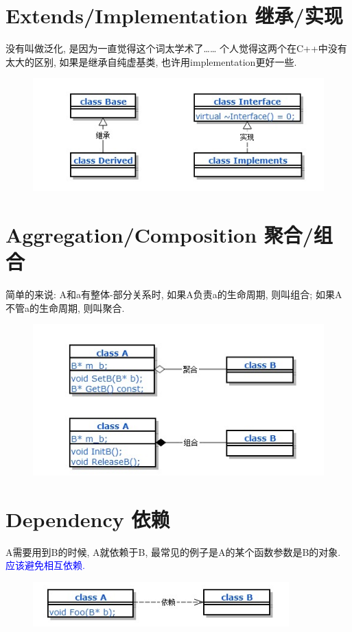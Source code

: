 \section {\ZHH Extends/Implementation 继承/实现} {
    { 没有叫做泛化, 是因为一直觉得这个词太学术了…… 个人觉得这两个在C++中没有太大的区别, 如果是继承自纯虚基类, 也许用implementation更好一些. } \\
    \begin {figure} [htbp]
        \centering
        \includegraphics [width=320pt, keepaspectratio] {implementation.png}
    \end {figure}
}

\section {\ZHH Aggregation/Composition 聚合/组合} {
    { 简单的来说: A和a有整体-部分关系时, 如果A负责a的生命周期, 则叫组合; 如果A不管a的生命周期, 则叫聚合. } \\
    \begin {figure} [htbp]
        \centering
        \includegraphics [width=320pt, keepaspectratio] {aggregation.png}
    \end {figure}
}

\section {\ZHH Dependency 依赖} {
    { A需要用到B的时候, A就依赖于B, 最常见的例子是A的某个函数参数是B的对象. } { \textcolor {blue} {应该避免相互依赖.} } \\
    \begin {figure} [htbp]
        \centering
        \includegraphics [width=280pt, keepaspectratio] {dependency.png}
    \end {figure}
}

